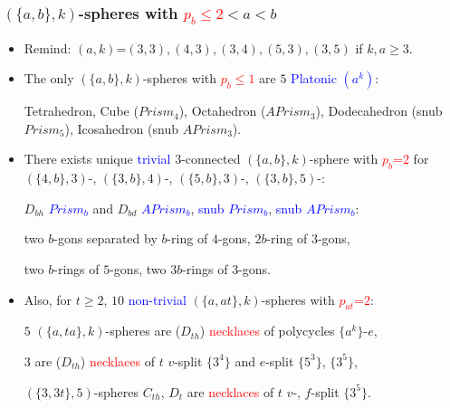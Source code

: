 \documentclass{beamer}
\begin{document}
\begin{frame}\frametitle{$(\{a,b\},k)$-spheres with  
\textcolor{red}{$p_b\le 2$}$<a<b$}
\vspace{-3.5mm}

\begin{itemize}
\item 
Remind:
$(a,k)$=$(3,3),(4,3),(3,4),(5,3), (3,5)$ if $k,a\ge 3$.

\item 
The only $(\{a,b\},k)$-spheres with \textcolor{red}{$p_b\le 1$} are 
$5$  \textcolor{blue}{Platonic $(a^k)$}:

Tetrahedron, Cube ($Prism_4$), Octahedron ($APrism_3$), Dodecahedron (snub 
$Prism_5$), Icosahedron (snub $APrism_3$). 

\item  
There exists unique \textcolor{blue}{trivial}
$3$-connected $(\{a,b\},k)$-sphere with \textcolor{red}{$p_b$=$2$} 
for
$(\{4,b\},3)$-, $(\{3,b\},4)$-,  $(\{5,b\},3)$-,
$(\{3,b\},5)$-:

$D_{bh}$ \textcolor{blue}{$Prism_b$}  and $D_{bd}$  
\textcolor{blue}{$APrism_b$}, 
\textcolor{blue}{snub $Prism_b$}, \textcolor{blue}{snub $APrism_b$}:   

two
$b$-gons separated by $b$-ring
of $4$-gons, $2b$-ring
of $3$-gons, 

two $b$-rings of $5$-gons, two $3b$-rings of $3$-gons.


\item 
Also, for $t$$\ge$$2$, 
 $10$ 
\textcolor{blue}{non-trivial}  $(\{a,at\},k)$-spheres with 
\textcolor{red}{$p_{at}$=$2$}:

$5$ 
$(\{a,ta\},k)$-spheres are ($D_{th}$)
\textcolor{red}{necklaces} of polycycles $\{a^k\}$-$e$,

 $3$ are ($D_{th}$)  \textcolor{red}{necklaces} of $t$ $v$-split
$\{3^4\}$ and $e$-split
 $\{5^3\}$, $\{3^5\}$,                              

 $(\{3,3t\},5)$-spheres $C_{th}$, $D_t$
are \textcolor{red}{necklaces} of $t$ $v$-, $f$-split $\{3^5\}$.
\end{itemize}
\end{frame}
\end{document}

